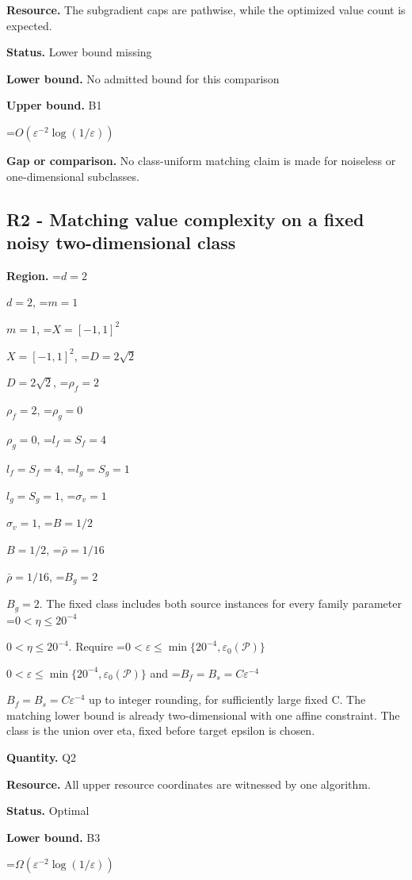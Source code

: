 \documentclass[10pt,a4paper]{article}
\newcommand{\AtlasMath}[1]{\par\begingroup\centering\setbox0=\hbox{$\displaystyle #1$}\ifdim\wd0>1.4\linewidth\typeout{ATLAS WIDE FORMULA: \the\wd0}\fi\ifdim\wd0>\linewidth\resizebox{\linewidth}{!}{\box0}\else\box0\fi\par\endgroup}
\newcommand{\AtlasInlineMath}[1]{\begingroup\setbox0=\hbox{$#1$}\ifdim\wd0>.4\linewidth\endgroup\AtlasMath{#1}\else\endgroup$#1$\fi}
\begin{document}
\textbf{Resource.} The subgradient caps are pathwise, while the optimized value count is expected.



\textbf{Status.} Lower bound missing



\textbf{Lower bound.} No admitted bound for this comparison



\textbf{Upper bound.} B1



\AtlasMath{O(\varepsilon^{-2}\log(1/\varepsilon))}


\textbf{Gap or comparison.} No class-uniform matching claim is made for noiseless or one-dimensional subclasses.



\subsection{R2 - Matching value complexity on a fixed noisy two-dimensional class}


\textbf{Region.} \AtlasInlineMath{d=2}, \AtlasInlineMath{m=1}, \AtlasInlineMath{X=[-1,1]^2}, \AtlasInlineMath{D=2\sqrt2}, \AtlasInlineMath{\rho_f=2}, \AtlasInlineMath{\rho_g=0}, \AtlasInlineMath{l_f=S_f=4}, \AtlasInlineMath{l_g=S_g=1}, \AtlasInlineMath{\sigma_v=1}, \AtlasInlineMath{B=1/2}, \AtlasInlineMath{\bar\rho=1/16}, \AtlasInlineMath{B_g=2}. The fixed class includes both source instances for every family parameter \AtlasInlineMath{0<\eta\le20^{-4}}. Require \AtlasInlineMath{0<\varepsilon\le\min\{20^{-4},\varepsilon_0(\mathcal P)\}} and \AtlasInlineMath{B_f=B_s=C\varepsilon^{-4}} up to integer rounding, for sufficiently large fixed C. The matching lower bound is already two-dimensional with one affine constraint. The class is the union over eta, fixed before target epsilon is chosen.



\textbf{Quantity.} Q2



\textbf{Resource.} All upper resource coordinates are witnessed by one algorithm.



\textbf{Status.} Optimal



\textbf{Lower bound.} B3



\AtlasMath{\Omega(\varepsilon^{-2}\log(1/\varepsilon))}
\end{document}
